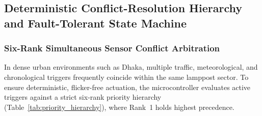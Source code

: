 \documentclass[11pt,a4paper]{article}
\begin{document}
\subsection{Deterministic Conflict-Resolution Hierarchy and Fault-Tolerant State Machine}

\subsubsection{Six-Rank Simultaneous Sensor Conflict Arbitration}
In dense urban environments such as Dhaka, multiple traffic, meteorological, and chronological triggers frequently coincide within the same lamppost sector. To ensure deterministic, flicker-free actuation, the microcontroller evaluates active triggers against a strict six-rank priority hierarchy (Table~\ref{tab:priority_hierarchy}), where Rank~1 holds highest precedence.
\end{document}
